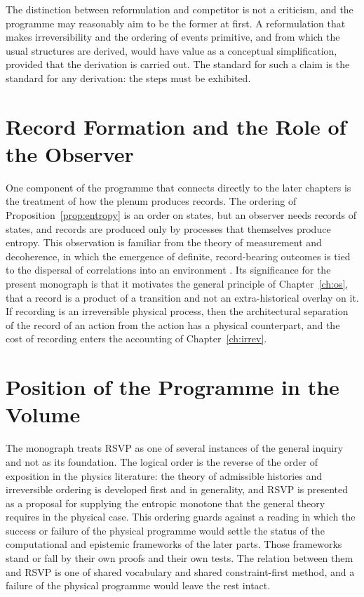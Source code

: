 \documentclass[11pt,twoside,openright]{book}
\theoremstyle{plain}
\theoremstyle{definition}
\theoremstyle{remark}
\newcommand{\rsvp}{RSVP}
\begin{document}
The distinction between reformulation and competitor is not a criticism, and the programme may reasonably aim to be the former at first. A reformulation that makes irreversibility and the ordering of events primitive, and from which the usual structures are derived, would have value as a conceptual simplification, provided that the derivation is carried out. The standard for such a claim is the standard for any derivation: the steps must be exhibited.

\section{Record Formation and the Role of the Observer}

One component of the programme that connects directly to the later chapters is the treatment of how the plenum produces records. The ordering of Proposition~\ref{prop:entropy} is an order on states, but an observer needs records of states, and records are produced only by processes that themselves produce entropy. This observation is familiar from the theory of measurement and decoherence, in which the emergence of definite, record-bearing outcomes is tied to the dispersal of correlations into an environment \cite{zurek2003}. Its significance for the present monograph is that it motivates the general principle of Chapter~\ref{ch:os}, that a record is a product of a transition and not an extra-historical overlay on it. If recording is an irreversible physical process, then the architectural separation of the record of an action from the action has a physical counterpart, and the cost of recording enters the accounting of Chapter~\ref{ch:irrev}.

\section{Position of the Programme in the Volume}

The monograph treats \rsvp{} as one of several instances of the general inquiry and not as its foundation. The logical order is the reverse of the order of exposition in the physics literature: the theory of admissible histories and irreversible ordering is developed first and in generality, and \rsvp{} is presented as a proposal for supplying the entropic monotone that the general theory requires in the physical case. This ordering guards against a reading in which the success or failure of the physical programme would settle the status of the computational and epistemic frameworks of the later parts. Those frameworks stand or fall by their own proofs and their own tests. The relation between them and \rsvp{} is one of shared vocabulary and shared constraint-first method, and a failure of the physical programme would leave the rest intact.
\end{document}
